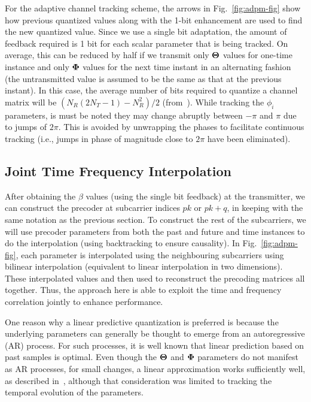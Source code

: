 \documentclass[journal,10pt,twocolumn]{IEEEtran}
\begin{document}
For the adaptive channel tracking scheme, the arrows in
Fig.~\ref{fig:adpm-fig} show how previous quantized values along with
the 1-bit enhancement are used to find the new quantized value. Since
we use a single bit adaptation, the amount of feedback required is 1
bit for each scalar parameter that is being tracked. On average, this
can be reduced by half if we transmit only $\bf{\Theta}$ values for
one-time instance and only $\bf{\Phi}$ values for the next time
instant in an alternating fashion (the untransmitted value is assumed
to be the same as that at the previous instant). In this case, the
average number of bits required to quantize a channel matrix will be
$(N_{R}(2N_{T} - 1) - N_R^2)/2$ (from~\cite{4114278}). While tracking
the $\phi_i$ parameters, is must be noted they may change abruptly
between $-\pi$ and $\pi$ due to jumps of $2\pi$. This is avoided by
unwrapping the phases to facilitate continuous tracking (i.e., jumps
in phase of magnitude close to $2\pi$ have been eliminated).
\subsection{Joint Time Frequency Interpolation}
\label{interp}
After obtaining the $\beta$ values (using the single bit feedback) at
the transmitter, we can construct the precoder at subcarrier indices
$pk$ or $pk+q$, in keeping with the same notation as the previous
section. To construct the rest of the subcarriers, we will use
precoder parameters from both the past and future and time instances
to do the interpolation (using backtracking to ensure causality). In
Fig.~\ref{fig:adpm-fig}, each parameter is interpolated using the
neighbouring subcarriers using bilinear interpolation (equivalent to
linear interpolation in two dimensions). These interpolated values and
then used to reconstruct the precoding matrices all together. Thus,
the approach here is able to exploit the time and frequency
correlation jointly to enhance performance.

One reason why a linear predictive quantization is preferred is
because the underlying parameters can generally be thought to emerge
from an autoregressive (AR) process. For such processes, it is well
known that linear prediction based on past samples is optimal. Even
though the $\bf{\Theta}$ and $\bf{\Phi}$ parameters do not manifest as AR
processes, for small changes, a linear approximation works
sufficiently well, as described in~\cite{4114278}, although that
consideration was limited to tracking the temporal evolution of the
parameters.
\end{document}

